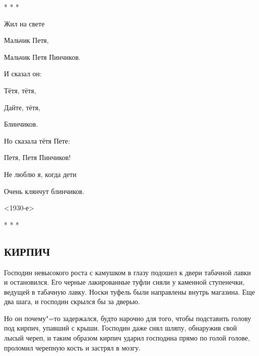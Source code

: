 \documentclass{article}
\begin{document}
\begin{center}* * *\end{center}

\begin{flushleft}\hspace*{20mm}Жил на свете 

\hspace*{20mm}Мальчик Петя, 

\hspace*{20mm}Мальчик Петя Пинчиков. 

\hspace*{20mm}И сказал он: 

\hspace*{20mm}Тётя, тётя, 

\hspace*{20mm}Дайте, тётя, 

\hspace*{20mm}Блинчиков. 

\textit{}

\hspace*{20mm}Но сказала тётя Пете: 

\hspace*{20mm}Петя, Петя Пинчиков! 

\hspace*{20mm}Не люблю я, когда дети 

\hspace*{20mm}Очень клянчут блинчиков.\end{flushleft}

\begin{flushright}<1930-е>\end{flushright}

\begin{center}* * *\end{center}

\begin{center}\subsection*{\textbf{КИРПИЧ}}\end{center}

Господин  невысокого роста с камушком  в глазу подошел к двери табачной лавки и остановился. Его черные лакированные туфли сияли у каменной ступенечки,  ведущей  в  табачную лавку. Носки туфель были  направлены  внутрь магазина. Еще два шага, и господин скрылся бы за дверью.

Но он почему"=то задержался, будто нарочно для того, чтобы подставить голову под кирпич, упавший с крыши. Господин даже снял шляпу, обнаружив свой лысый череп, и таким образом кирпич ударил господина прямо по голой голове, проломил черепную кость и застрял в мозгу.
\end{document}
